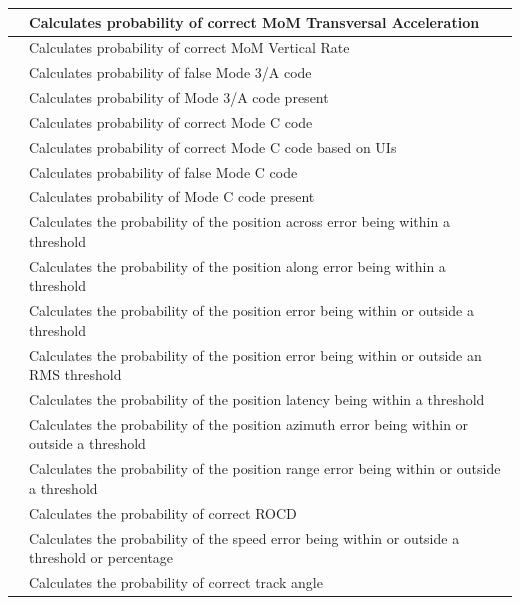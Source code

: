 \begin{center}
\begin{table}[H]
\begin{tabularx}{\textwidth}{ | l | X |  }
    \nameref{sec:eval_req_mom_trans} & Calculates probability of correct MoM Transversal Acceleration \\ \hline
    \nameref{sec:eval_req_mom_vert} & Calculates probability of correct MoM Vertical Rate \\ \hline
    \nameref{sec:eval_req_m3a_false} & Calculates probability of false Mode 3/A code \\ \hline
    \nameref{sec:eval_req_m3a_present} & Calculates probability of Mode 3/A code present \\ \hline
    \nameref{sec:eval_req_mc_correct} & Calculates probability of correct Mode C code \\ \hline
    \nameref{sec:eval_req_mc_correct_periods} & Calculates probability of correct Mode C code based on UIs \\ \hline
    \nameref{sec:eval_req_mc_false} & Calculates probability of false Mode C code \\ \hline
    \nameref{sec:eval_req_mc_present} & Calculates probability of Mode C code present \\ \hline
    \nameref{sec:eval_req_pos_across} & Calculates the probability of the position across error being within a threshold \\ \hline
    \nameref{sec:eval_req_pos_along} & Calculates the probability of the position along error being within a threshold \\ \hline
    \nameref{sec:eval_req_pos_distance} & Calculates the probability of the position error being within or outside a threshold \\ \hline
    \nameref{sec:eval_req_pos_distance_rms} & Calculates the probability of the position error being within or outside an RMS threshold \\ \hline
    \nameref{sec:eval_req_pos_latency}  & Calculates the probability of the position latency being within a threshold \\ \hline
    \nameref{sec:eval_req_pos_radar_azm} & Calculates the probability of the position azimuth error being within or outside a threshold \\ \hline
    \nameref{sec:eval_req_pos_radar_rng} & Calculates the probability of the position range error being within or outside a threshold \\ \hline
    \nameref{sec:eval_req_rocd_correct} & Calculates the probability of correct ROCD \\ \hline
    \nameref{sec:eval_req_speed} & Calculates the probability of the speed error being within or outside a threshold or percentage \\ \hline
    \nameref{sec:eval_req_track_angle} & Calculates the probability of correct track angle \\ \hline
\end{tabularx}
\end{table}
\end{center}
\ \\

